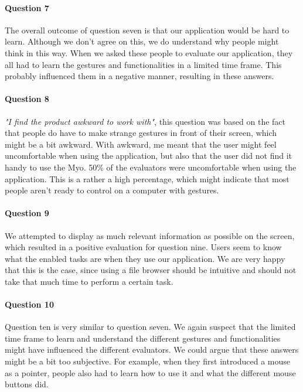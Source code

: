 \documentclass{article}
\begin{document}
\paragraph{Question 7}

The overall outcome of question seven is that our application would be hard to learn. Although we don't agree on this, we do understand why people might think in this way. When we asked these people to evaluate our application, they all had to learn the gestures and functionalities in a limited time frame. This probably influenced them in a negative manner, resulting in these answers.

\paragraph{Question 8}

\textit{"I find the product awkward to work with"}, this question was based on the fact that people do have to make strange gestures in front of their screen, which might be a bit awkward. With awkward, me meant that the user might feel uncomfortable when using the application, but also that the user did not find it handy to use the Myo. 50\% of the evaluators were uncomfortable when using the application. This is a rather a high percentage, which might indicate that most people aren't ready to control on a computer with gestures.

\paragraph{Question 9}

We attempted to display as much relevant information as possible on the screen, which resulted in a positive evaluation for question nine. Users seem to know what the enabled tasks are when they use our application. We are very happy that this is the case, since using a file browser should be intuitive and should not take that much time to perform a certain task.

\paragraph{Question 10}

Question ten is very similar to question seven. We again suspect that the limited time frame to learn and understand the different gestures and functionalities might have influenced the different evaluators. We could argue that these answers might be a bit too subjective. For example, when they first introduced a mouse as a pointer, people also had to learn how to use it and what the different mouse buttons did.
\end{document}
